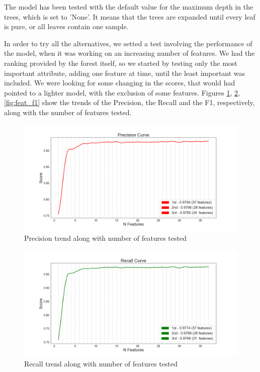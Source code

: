 The model has been tested with the default value for the maximum depth in the trees, which is set to 'None'. It means that the trees are expanded until every leaf is pure, or all leaves contain one sample.

In order to try all the alternatives, we setted a test involving the performance of the model, when it was working on an increasing number of features.
We had the ranking provided by the forest itself, so we started by testing only the most important attribute, adding one feature at time, until the least important was included.
We were looking for some changing in the scores, that would had pointed to a lighter model, with the exclusion of some features.
Figures \ref{fig:feat_prec}, \ref{fig:feat_rec}, \ref{fig:feat_f1} show the trends of the Precision, the Recall and the F1, respectively, along with the number of features tested.
 \begin{figure}[htp!]
 	\centering
 	\includegraphics[width=\columnwidth]{chapter5/figure/precision_along_features.png}
 	\caption{Precision trend along with number of features tested}
 	\label{fig:feat_prec}
 \end{figure}
\begin{figure}[htp!]
	\centering
	\includegraphics[width=\columnwidth]{chapter5/figure/recall_along_features.png}
	\caption{Recall trend along with number of features tested}
	\label{fig:feat_rec}
\end{figure}
